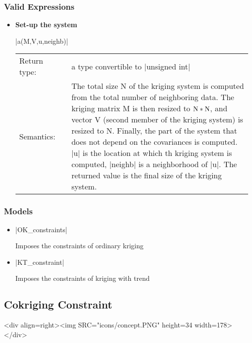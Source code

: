 \documentclass[12pt,twoside]{report}
\begin{document}
 

\htmlrule[CLEAR=all]  \subsubsection*{Valid Expressions}
\begin{itemize}
\item {\bf Set-up the system}

  |a(M,V,u,neighb)|
  
  \begin{tabular}[!h]{l p{1cm} p{10cm}}
    Return type: & & a type convertible to |unsigned int|\\
    Semantics: & & The total size N of the kriging system is computed from the total number of neighboring data. The kriging matrix M is then resized to $\rm{N}*\rm{N}$, and vector V (second member of the kriging system) is resized to N. Finally, the part of the  system that does not depend on the covariances is computed. |u| is the location at which th kriging system is computed, |neighb| is a neighborhood of |u|. The returned value is the final size of the kriging system.\\
    
  \end{tabular}

\end{itemize}

\htmlrule[CLEAR=all]  \subsubsection*{Models}
\begin{itemize}
\item |OK_constraints|

Imposes the constraints of ordinary kriging 

\item |KT_constraint|

Imposes the constraints of kriging with trend 

\end{itemize}



%
\subsection{Cokriging Constraint}
\label{concept:cokrigingconstraint}
\begin{htmlonly}
<div align=right><img SRC="icons/concept.PNG" height=34 width=178></div>
\end{htmlonly}
\end{document}
